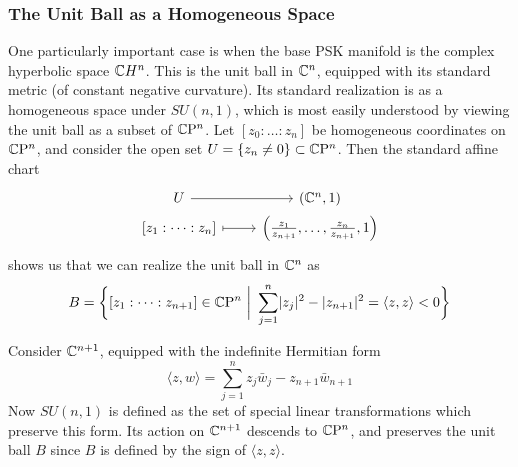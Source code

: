 \documentclass[parskip=half]{scrartcl}
\begin{document}
\subsubsection{The Unit Ball as a Homogeneous Space}

One particularly important case is when the base PSK manifold is the complex hyperbolic space $\mathbb{C} H^n$. This is the unit ball in $\mathbb{C}^n$, equipped with its standard metric (of constant negative curvature). Its standard realization is as a homogeneous space under $SU(n,1)$, which is most easily understood by viewing the unit ball as a subset of $\mathbb{C}\mathrm{P}^n$. Let $[z_0:\dots : z_n]$ be homogeneous coordinates on $\mathbb{C}\mathrm{P}^n$, and consider the open set $U=\{z_n\neq 0\}\subset \mathbb{C}\mathrm{P}^n$. Then the standard affine chart
\begin{equation*}
	\begin{tikzcd}[row sep=0cm]
		U \arrow{r} & (\C^n,1) \\
		{[z_1:\dots : z_n]} \arrow[mapsto]{r} & \Big(\frac{z_1}{z_{n+1}},\dots, \frac{z_n}{z_{n+1}},1\Big)
	\end{tikzcd}
\end{equation*}
shows us that we can realize the unit ball in $\mathbb{C}^n$ as
\begin{equation*}
	B= \bigg\{[z_1:\dots: z_{n+1}]\in \CP^n\ \bigg|\ \sum_{j=1}^n\abs{z_j}^2-\abs{z_{n+1}}^2=\langle z,z\rangle<0\bigg\}
\end{equation*}

Consider $\mathbb{C}^{n+1}$, equipped with the indefinite Hermitian form 
\begin{equation*}
	\langle z, w \rangle = \sum_{j=1}^n z_j \bar w_j - z_{n+1}\bar w_{n+1}
\end{equation*}
Now $SU(n,1)$ is defined as the set of special linear transformations which preserve this form. Its action on $\mathbb{C}^{n+1}$ descends to $\mathbb{C}\mathrm{P}^n$, and preserves the unit ball $B$ since $B$ is defined by the sign of $\langle z,z\rangle$. 
\end{document}
